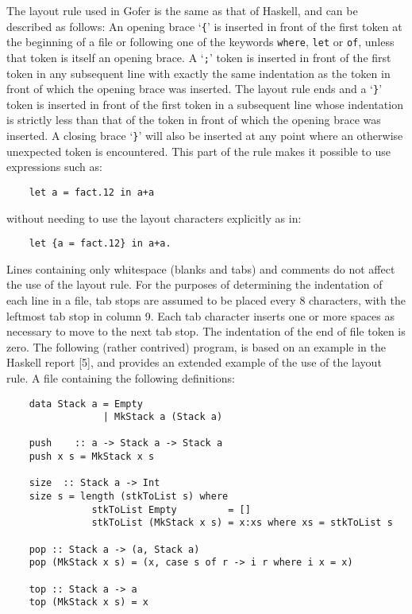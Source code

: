 The layout rule used in Gofer is the same as that of Haskell,  and  can
be described as follows:
\BI
\IT  An opening brace `\verb"{"' is inserted in front of the  first  token  at
     the beginning of a file or following one of the keywords  \verb"where",
     \verb"let" or \verb"of", unless that token is itself an opening brace.
\IT  A `\verb";"' token is inserted in front of the first token in any subsequent
     line with exactly the same indentation as the token  in  front  of
     which the opening brace was inserted.
\IT  The layout rule ends and a `\verb"}"' token is inserted in front  of  the
     first token in a subsequent line  whose  indentation  is  strictly
     less than that of the token in front of which  the  opening  brace
     was inserted.
\IT  A closing brace `\verb"}"' will also be inserted at any  point  where  an
     otherwise unexpected token is encountered.  This part of the rule
     makes it possible to use expressions such as:
\begin{verbatim}
    let a = fact.12 in a+a
\end{verbatim}
     without needing to use the layout characters explicitly as in:
\begin{verbatim}
    let {a = fact.12} in a+a.
\end{verbatim}
\IT  Lines containing only whitespace (blanks and tabs) and comments do
     not affect the use of the layout rule.
\IT  For the purposes of determining the indentation of each line in  a
     file, tab stops are assumed to be placed every 8 characters,  with
     the leftmost tab stop in column 9.  Each tab character inserts one
     or more spaces as necessary to move to the next tab stop.
\IT  The indentation of the end of file token is zero.
\EI
The following (rather contrived) program, is based on an example in the
Haskell report [5], and provides an extended example of the use of  the
layout rule.  A file containing the following definitions:
\begin{verbatim}
    data Stack a = Empty
                 | MkStack a (Stack a)

    push    :: a -> Stack a -> Stack a
    push x s = MkStack x s

    size  :: Stack a -> Int
    size s = length (stkToList s) where
               stkToList Empty         = []
               stkToList (MkStack x s) = x:xs where xs = stkToList s

    pop :: Stack a -> (a, Stack a)
    pop (MkStack x s) = (x, case s of r -> i r where i x = x)

    top :: Stack a -> a
    top (MkStack x s) = x
\end{verbatim}
